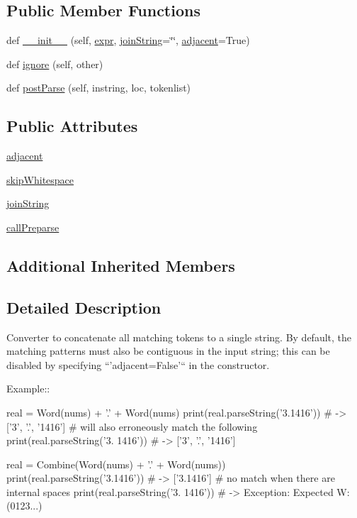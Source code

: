 \subsection*{Public Member Functions}
\begin{DoxyCompactItemize}
\item 
def \hyperlink{classpyparsing_1_1Combine_aea517a18e3f3af05a758c8425f801882}{\+\_\+\+\_\+init\+\_\+\+\_\+} (self, \hyperlink{classpyparsing_1_1ParseElementEnhance_a0139048279aeac38804a10d131d3c340}{expr}, \hyperlink{classpyparsing_1_1Combine_af29f4f370d67f512fdb0124268e6c98b}{join\+String}=\char`\"{}\char`\"{}, \hyperlink{classpyparsing_1_1Combine_a21015dbc75caf4ec46760504d28cc5b4}{adjacent}=True)
\item 
def \hyperlink{classpyparsing_1_1Combine_ad74c8919ff98415bdfffb1f5abdd7cc4}{ignore} (self, other)
\item 
def \hyperlink{classpyparsing_1_1Combine_a38a68fcc9ded0a35390a0a77c70ec37b}{post\+Parse} (self, instring, loc, tokenlist)
\end{DoxyCompactItemize}
\subsection*{Public Attributes}
\begin{DoxyCompactItemize}
\item 
\hyperlink{classpyparsing_1_1Combine_a21015dbc75caf4ec46760504d28cc5b4}{adjacent}
\item 
\hyperlink{classpyparsing_1_1Combine_ac47d5ae106499d773a6d1fdddcf23166}{skip\+Whitespace}
\item 
\hyperlink{classpyparsing_1_1Combine_af29f4f370d67f512fdb0124268e6c98b}{join\+String}
\item 
\hyperlink{classpyparsing_1_1Combine_a50ca3727f830f42303a2a3c3395deec0}{call\+Preparse}
\end{DoxyCompactItemize}
\subsection*{Additional Inherited Members}


\subsection{Detailed Description}
\begin{DoxyVerb}Converter to concatenate all matching tokens to a single string.
By default, the matching patterns must also be contiguous in the
input string; this can be disabled by specifying
``'adjacent=False'`` in the constructor.

Example::

    real = Word(nums) + '.' + Word(nums)
    print(real.parseString('3.1416')) # -> ['3', '.', '1416']
    # will also erroneously match the following
    print(real.parseString('3. 1416')) # -> ['3', '.', '1416']

    real = Combine(Word(nums) + '.' + Word(nums))
    print(real.parseString('3.1416')) # -> ['3.1416']
    # no match when there are internal spaces
    print(real.parseString('3. 1416')) # -> Exception: Expected W:(0123...)
\end{DoxyVerb}
 

